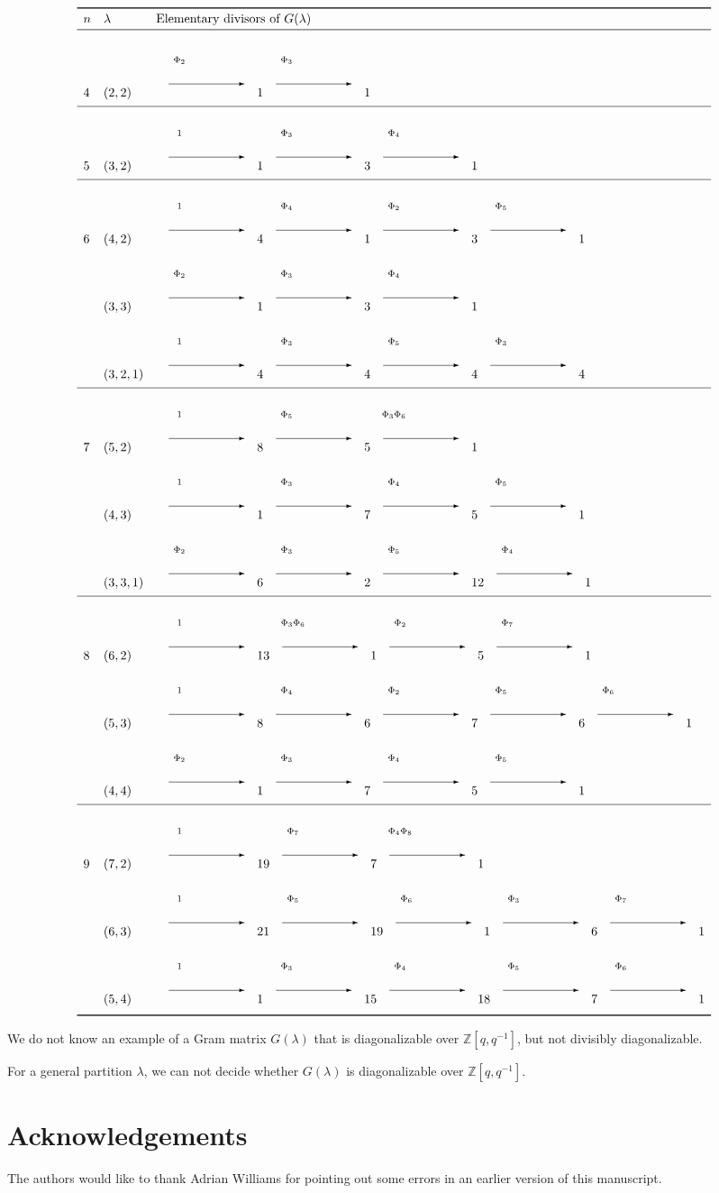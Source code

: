 \documentclass[twoside]{amsart}
\newcommand{\lraa}[1]{\begin{picture}(80,50)      %
                      \put(  10,  10){\vector(1,0){60}}
                      \put(  10,  27){\makebox[6mm]{$\scriptstyle #1$}}
                      \end{picture} }
\numberwithin{equation}{section}
\theoremstyle{remark}
\def\Z{{\mathbb Z}}
\begin{document}
\begin{footnotesize}
$$\begin{array}{lll}\toprule
n& \lambda&\text{Elementary divisors of\ } G(\lambda) \\\midrule
4&(2,2)   &\lraa{\Phi_2} 1\lraa{\Phi_3} 1 \\[4pt]\hline
5&(3,2)   &\lraa{1} 1\lraa{\Phi_3} 3\lraa{\Phi_4} 1 \\[4pt]\hline
6&(4,2)   &\lraa{1} 4\lraa{\Phi_4} 1 \lraa{\Phi_2} 3\lraa{\Phi_5} 1 \\ 
 &(3,3)   &\lraa{\Phi_2} 1\lraa{\Phi_3} 3\lraa{\Phi_4} 1 \\
 &(3,2,1) &\lraa{1} 4\lraa{\Phi_3} 4\lraa{\Phi_5} 4\lraa{\Phi_3} 4 \\[4pt]\hline
7&(5,2)   &\lraa{1} 8\lraa{\Phi_5} 5\lraa{\Phi_3\Phi_6} 1 \\
 &(4,3)   &\lraa{1} 1\lraa{\Phi_3} 7\lraa{\Phi_4} 5\lraa{\Phi_5} 1 \\
 &(3,3,1) &\lraa{\Phi_2} 6 \lraa{\Phi_3} 2\lraa{\Phi_5} 12\lraa{\Phi_4} 1\\[4pt]\hline
8&(6,2)   &\lraa{1} 13\lraa{\Phi_3\Phi_6} 1 \lraa{\Phi_2} 5\lraa{\Phi_7} 1 \\
 &(5,3)   &\lraa{1} 8\lraa{\Phi_4} 6\lraa{\Phi_2} 7\lraa{\Phi_5} 6\lraa{\Phi_6} 1 \\
 &(4,4)   &\lraa{\Phi_2} 1\lraa{\Phi_3} 7\lraa{\Phi_4} 5\lraa{\Phi_5} 1 \\[4pt]\hline
9&(7,2)   &\lraa{1} 19 \lraa{\Phi_7} 7 \lraa{\Phi_4\Phi_8} 1 \\
 &(6,3)   &\lraa{1}21\lraa{\Phi_5}19\lraa{\Phi_6} 1 \lraa{\Phi_3} 6\lraa{\Phi_7} 1\\
 &(5,4)   &\lraa{1} 1\lraa{\Phi_3} 15\lraa{\Phi_4} 18\lraa{\Phi_5} 7\lraa{\Phi_6} 1 
\\[4pt]\bottomrule
\end{array}$$
\end{footnotesize}

We do not know an example of a Gram matrix $G(\lambda)$ that is diagonalizable over
$\Z[q,q^{-1}]$, but not divisibly diagonalizable.

For a general partition $\lambda$, we can not decide whether
$G(\lambda)$ is diagonalizable over $\Z[q,q^{-1}]$.

\section*{Acknowledgements}
The authors would like to thank Adrian Williams for pointing out some
errors in an earlier version of this manuscript.
\end{document}
